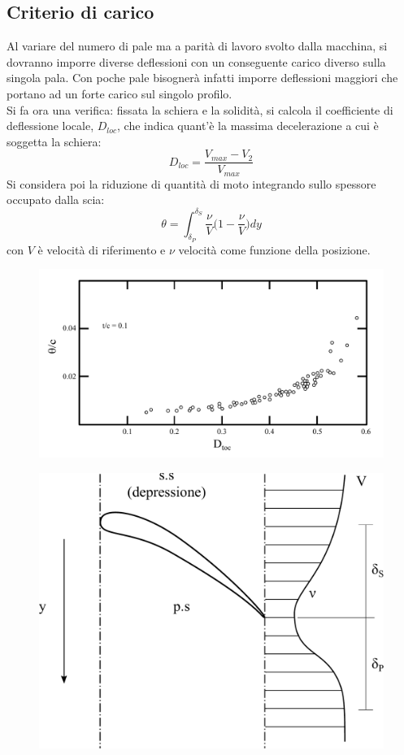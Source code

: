 \subsection{Criterio di carico}
Al variare del numero di pale ma a parità di lavoro svolto dalla macchina, si dovranno imporre diverse deflessioni con un conseguente carico diverso sulla singola pala. Con poche pale bisognerà infatti imporre deflessioni maggiori che portano ad un forte carico sul singolo profilo.\\
Si fa ora una verifica: fissata la schiera e la solidità, si calcola il coefficiente di deflessione locale, $D_{loc}$, che indica quant'è la massima decelerazione a cui è soggetta la schiera:
\begin{equation}\label{eq:D_loc}
D_{loc} = \frac{V_{max} - V_2}{V_{max}}
\end{equation}
Si considera poi la riduzione di quantità di moto integrando sullo spessore occupato dalla scia:
\begin{equation}\label{eq:D_ridqmot}
\theta = \int_{\delta_P}^{\delta_S} \frac{\nu}{V} \bigg(1- \frac{\nu}{V} \bigg) dy
\end{equation} 
con $V$ è velocità di riferimento e $\nu$ velocità come funzione della posizione.
\begin{figure}
\centering
  \includegraphics[width=\textwidth]{fig/CritCarico1.pdf}
\caption{}
\label{fig:CritCarico1}
\end{figure}
\begin{figure}
\centering
  \includegraphics[width=.4\textwidth]{fig/CritCarico2.pdf}
\caption{}
\label{fig:CritCarico2}
\end{figure}
